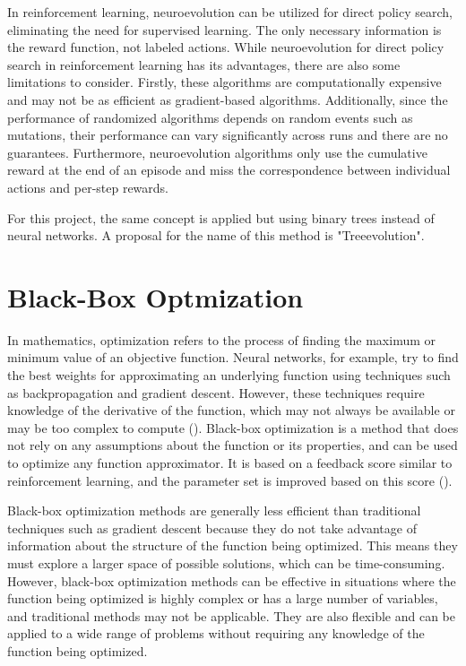 In reinforcement learning, neuroevolution can be utilized for direct policy search, eliminating the need for supervised learning. The only necessary information is the reward function, not labeled actions. While neuroevolution for direct policy search in reinforcement learning has its advantages, there are also some limitations to consider. Firstly, these algorithms are computationally expensive and may not be as efficient as gradient-based algorithms. Additionally, since the performance of randomized algorithms depends on random events such as mutations, their performance can vary significantly across runs and there are no guarantees. Furthermore, neuroevolution algorithms only use the cumulative reward at the end of an episode and miss the correspondence between individual actions and per-step rewards.

For this project, the same concept is applied but using binary trees instead of neural networks. A proposal for the name of this method is "Treeevolution".

\section{Black-Box Optmization}

In mathematics, optimization refers to the process of finding the maximum or minimum value of an objective function. Neural networks, for example, try to find the best weights for approximating an underlying function using techniques such as backpropagation and gradient descent. However, these techniques require knowledge of the derivative of the function, which may not always be available or may be too complex to compute (\cite{schaul_studies_nodate}). Black-box optimization is a method that does not rely on any assumptions about the function or its properties, and can be used to optimize any function approximator. It is based on a feedback score similar to reinforcement learning, and the parameter set is improved based on this score (\cite{anderson_introduction_1995}).

Black-box optimization methods are generally less efficient than traditional techniques such as gradient descent because they do not take advantage of information about the structure of the function being optimized. This means they must explore a larger space of possible solutions, which can be time-consuming. However, black-box optimization methods can be effective in situations where the function being optimized is highly complex or has a large number of variables, and traditional methods may not be applicable. They are also flexible and can be applied to a wide range of problems without requiring any knowledge of the function being optimized.

